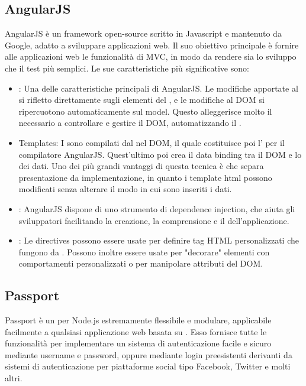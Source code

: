 \subsection{AngularJS}
AngularJS è un framework open-source scritto in Javascript e mantenuto da Google, adatto a sviluppare applicazioni web. Il suo obiettivo principale è fornire alle applicazioni web le funzionalità di MVC, in modo da rendere sia lo sviluppo che il test più semplici.
Le sue caratteristiche più significative sono:
\begin{itemize}
\item {}: Una delle caratteristiche principali di AngularJS. Le modifiche apportate al  si rifletto direttamente sugli elementi del , e le modifiche al DOM si ripercuotono automaticamente sul model. Questo alleggerisce molto il  necessario a controllare e gestire il DOM, automatizzando il .
\item Templates: I   sono compilati dal  nel DOM, il quale costituisce poi l' per il compilatore AngularJS. Quest'ultimo poi crea il data binding tra il DOM e lo  dei dati. Uno dei più grandi vantaggi di questa tecnica è che separa presentazione da implementazione, in quanto i template html possono modificati senza alterare il modo in cui sono inseriti i dati.
\item {}: AngularJS dispone di uno strumento di dependence injection, che aiuta gli sviluppatori facilitando la creazione, la comprensione e il  dell'applicazione.
\item {}: Le directives possono essere usate per definire tag HTML personalizzati che fungono da . Possono inoltre essere usate per "decorare" elementi con comportamenti personalizzati o per manipolare attributi del DOM.

\end{itemize}

\subsection{Passport}
Passport è un  per Node.js estremamente flessibile e modulare, applicabile facilmente a qualsiasi applicazione web basata su . Esso fornisce tutte le funzionalità per implementare un sistema di autenticazione facile e sicuro mediante username e password, oppure mediante login preesistenti derivanti da sistemi di autenticazione per piattaforme social tipo Facebook, Twitter e molti altri.

